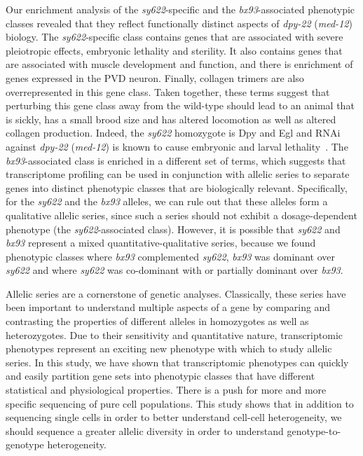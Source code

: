 \documentclass[10pt, onecolumn]{article}
\newcommand{\gene}[1]{\mbox{\emph{#1}}}
\newcommand{\dpy}{\gene{dpy-22} (\emph{med-12})}
\begin{document}
Our enrichment analysis of the \emph{sy622}-specific and the
\emph{bx93}-associated phenotypic classes revealed that they reflect
functionally distinct aspects of \dpy{} biology. The \emph{sy622}-specific class
contains genes that are associated with severe pleiotropic effects, embryonic
lethality and sterility. It also contains genes that are associated with muscle
development and function, and there is enrichment of genes expressed in the PVD
neuron. Finally, collagen trimers are also overrepresented in this gene class.
Taken together, these terms suggest that perturbing this gene class away from
the wild-type should lead to an animal that is sickly, has a small brood size
and has altered locomotion as well as altered collagen production. Indeed, the
\emph{sy622} homozygote is Dpy and Egl and RNAi against \dpy{} is known to cause
embryonic and larval lethality~\cite{}. The \emph{bx93}-associated class is
enriched in a different set of terms, which suggests that transcriptome
profiling can be used in conjunction with allelic series to separate genes into
distinct phenotypic classes that are biologically relevant. Specifically, for the
\emph{sy622} and the \emph{bx93} alleles, we can rule out that these alleles form
a qualitative allelic series, since such a series should not exhibit a
dosage-dependent phenotype (the \emph{sy622}-associated class). However, it is
possible that \emph{sy622} and \emph{bx93} represent a mixed quantitative-qualitative
series, because we found phenotypic classes where \emph{bx93} complemented
\emph{sy622}, \emph{bx93} was dominant over \emph{sy622} and where \emph{sy622}
was co-dominant with or partially dominant over \emph{bx93}.

Allelic series are a cornerstone of genetic analyses. Classically, these series
have been important to understand multiple aspects of a gene
by comparing and contrasting the properties of different alleles in homozygotes
as well as heterozygotes. Due to their sensitivity and quantitative nature,
transcriptomic phenotypes represent an exciting new phenotype with which to
study allelic series. In this study, we have shown that transcriptomic phenotypes
can quickly and easily partition gene sets into phenotypic classes that have
different statistical and physiological properties. There is a push for more
and more specific sequencing of pure cell populations. This study shows that in
addition to sequencing single cells in order to better understand cell-cell
heterogeneity, we should sequence a greater allelic diversity in order to
understand genotype-to-genotype heterogeneity.
\end{document}
